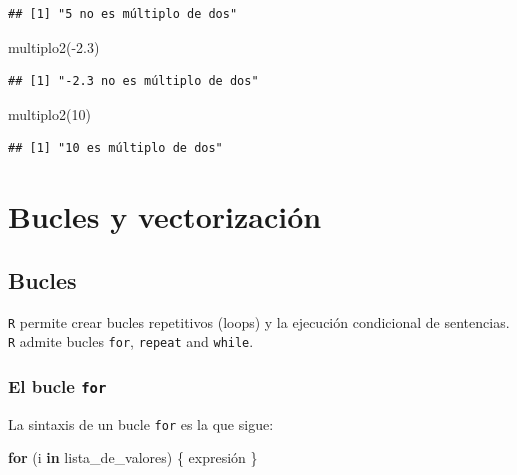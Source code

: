\documentclass[
]{book}
\newenvironment{Shaded}{\begin{snugshade}}{\end{snugshade}}
\newcommand{\ControlFlowTok}[1]{\textcolor[rgb]{0.13,0.29,0.53}{\textbf{#1}}}
\newcommand{\DecValTok}[1]{\textcolor[rgb]{0.00,0.00,0.81}{#1}}
\newcommand{\FloatTok}[1]{\textcolor[rgb]{0.00,0.00,0.81}{#1}}
\newcommand{\FunctionTok}[1]{\textcolor[rgb]{0.00,0.00,0.00}{#1}}
\newcommand{\NormalTok}[1]{#1}
\newcommand{\SpecialCharTok}[1]{\textcolor[rgb]{0.00,0.00,0.00}{#1}}
\theoremstyle{break}
\begin{document}
\begin{verbatim}
## [1] "5 no es múltiplo de dos"
\end{verbatim}

\begin{Shaded}
\begin{Highlighting}[]
\FunctionTok{multiplo2}\NormalTok{(}\SpecialCharTok{{-}}\FloatTok{2.3}\NormalTok{)}
\end{Highlighting}
\end{Shaded}

\begin{verbatim}
## [1] "-2.3 no es múltiplo de dos"
\end{verbatim}

\begin{Shaded}
\begin{Highlighting}[]
\FunctionTok{multiplo2}\NormalTok{(}\DecValTok{10}\NormalTok{)}
\end{Highlighting}
\end{Shaded}

\begin{verbatim}
## [1] "10 es múltiplo de dos"
\end{verbatim}

\hypertarget{bucles-y-vectorizaciuxf3n}{%
\section{Bucles y vectorización}\label{bucles-y-vectorizaciuxf3n}}

\hypertarget{bucles}{%
\subsection{Bucles}\label{bucles}}

\texttt{R} permite crear bucles repetitivos
(loops) y la ejecución condicional de sentencias. \texttt{R} admite bucles
\texttt{for}, \texttt{repeat} and \texttt{while}.

\hypertarget{el-bucle-for}{%
\subsubsection{\texorpdfstring{El bucle \texttt{for}}{El bucle for}}\label{el-bucle-for}}

La sintaxis de un bucle \texttt{for} es la que sigue:

\begin{Shaded}
\begin{Highlighting}[]
\ControlFlowTok{for}\NormalTok{ (i }\ControlFlowTok{in}\NormalTok{ lista\_de\_valores)  \{ expresión \}}
\end{Highlighting}
\end{Shaded}
\end{document}
